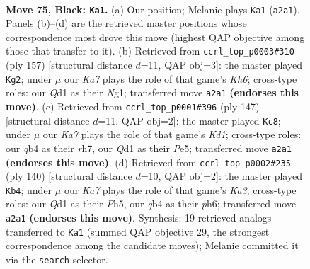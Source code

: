 \documentclass[11pt]{article}
\begin{document}
\clearpage

\begin{figure}[p]\centering
\begin{subfigure}{0.46\textwidth}\centering
\resizebox{\linewidth}{!}{%
\newchessgame
\chessboard[
  setfen={7K/8/6N1/8/1Q6/8/k7/3q4 b - - 20 75},
  showmover=false,
  pgfstyle=straightmove, color=movearrow, markmove={a2-a1}
]}
\caption{}
\end{subfigure}\hfill
\begin{subfigure}{0.46\textwidth}\centering
\resizebox{\linewidth}{!}{%
\newchessgame
\chessboard[
  setfen={2Q5/8/8/8/8/7k/1K6/3N2n1 b - - 0 79},
  showmover=false,
  pgfstyle=straightmove, color=movearrow, markmove={h3-g2}
]}
\caption{}
\end{subfigure}
\\[4pt]
\begin{subfigure}{0.46\textwidth}\centering
\resizebox{\linewidth}{!}{%
\newchessgame
\chessboard[
  setfen={3k4/7R/8/4p1K1/4N3/8/8/5r2 b - - 6 74},
  showmover=false,
  pgfstyle=straightmove, color=movearrow, markmove={d8-c8}
]}
\caption{}
\end{subfigure}\hfill
\begin{subfigure}{0.46\textwidth}\centering
\resizebox{\linewidth}{!}{%
\newchessgame
\chessboard[
  setfen={5k2/8/4n2p/7P/8/K7/2B5/8 w - - 17 71},
  showmover=false,
  pgfstyle=straightmove, color=movearrow, markmove={a3-b4}
]}
\caption{}
\end{subfigure}
\caption{\textbf{Move 75, Black: \texttt{Ka1}.} (a) Our position; Melanie plays \texttt{Ka1} (\texttt{a2a1}). Panels (b)--(d) are the retrieved master positions whose correspondence most drove this move (highest QAP objective among those that transfer to it). (b) Retrieved from \texttt{ccrl\_top\_p0003\#310} (ply 157) [structural distance $d$=11, QAP obj=3]: the master played \texttt{Kg2}; under $\mu$ our \emph{Ka7} plays the role of that game's \emph{Kh6}; cross-type roles: our \emph{Q}d1 as their \emph{N}g1; transferred move \texttt{a2a1} \textbf{(endorses this move)}. (c) Retrieved from \texttt{ccrl\_top\_p0001\#396} (ply 147) [structural distance $d$=11, QAP obj=2]: the master played \texttt{Kc8}; under $\mu$ our \emph{Ka7} plays the role of that game's \emph{Kd1}; cross-type roles: our \emph{q}b4 as their \emph{r}h7, our \emph{Q}d1 as their \emph{P}e5; transferred move \texttt{a2a1} \textbf{(endorses this move)}. (d) Retrieved from \texttt{ccrl\_top\_p0002\#235} (ply 140) [structural distance $d$=10, QAP obj=2]: the master played \texttt{Kb4}; under $\mu$ our \emph{Ka7} plays the role of that game's \emph{Ka3}; cross-type roles: our \emph{Q}d1 as their \emph{P}h5, our \emph{q}b4 as their \emph{p}h6; transferred move \texttt{a2a1} \textbf{(endorses this move)}. Synthesis: 19 retrieved analogs transferred to \texttt{Ka1} (summed QAP objective 29, the strongest correspondence among the candidate moves); Melanie committed it via the \texttt{search} selector.}
\label{fig:thought-m149}
\end{figure}
\end{document}
